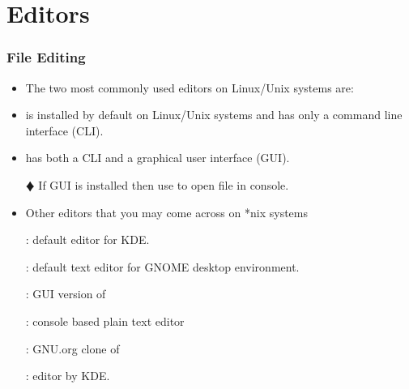 \documentclass[10pt,t]{beamer}
\begin{document}
\section{Editors}
\begin{frame}
  \frametitle{File Editing}
  \begin{itemize}
    \item The two most commonly used editors on Linux/Unix systems are:
    \item {} is installed by default on Linux/Unix systems and has only a command line interface (CLI).
    \item {} has both a CLI and a graphical user interface (GUI).
    \item[$\vardiamond$] If  GUI is installed then use  to open file in console.
    \item Other editors that you may come across on *nix systems
    \item[] : {default editor for KDE.}
    \item[] : {default text editor for GNOME desktop environment.}
    \item[] : {GUI version of }
    \item[] : {console based plain text editor }
    \item[] : {GNU.org clone of }
    \item[] : {editor by KDE.}
  \end{itemize}
\end{frame}
\end{document}

